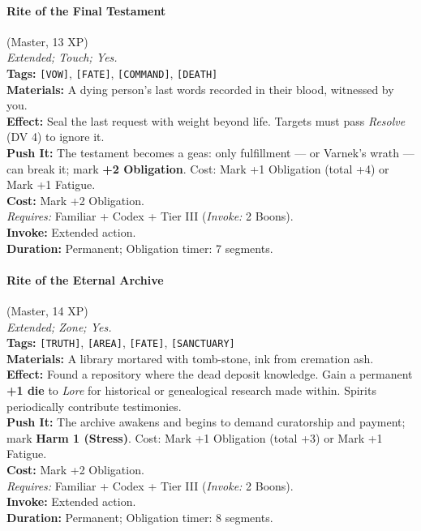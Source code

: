 \paragraph{Rite of the Final Testament} (Master, 13 XP) \hfill \\
\emph{Extended; Touch; Yes.} \\
\textbf{Tags:} \texttt{[VOW]}, \texttt{[FATE]}, \texttt{[COMMAND]}, \texttt{[DEATH]} \\
\textbf{Materials:} A dying person's last words recorded in their blood, witnessed by you. \\
\textbf{Effect:} Seal the last request with weight beyond life. Targets must pass \textit{Resolve} (DV 4) to ignore it. \\
\textbf{Push It:} The testament becomes a geas: only fulfillment --- or Varnek's wrath --- can break it; mark \textbf{+2 Obligation}. Cost: Mark +1 Obligation (total +4) or Mark +1 Fatigue. \\
\textbf{Cost:} Mark +2 Obligation. \\
\textit{Requires:} Familiar + Codex + Tier III (\textit{Invoke:} 2 Boons). \\
\textbf{Invoke:} Extended action. \\
\textbf{Duration:} Permanent; Obligation timer: 7 segments.

\paragraph{Rite of the Eternal Archive} (Master, 14 XP) \hfill \\
\emph{Extended; Zone; Yes.} \\
\textbf{Tags:} \texttt{[TRUTH]}, \texttt{[AREA]}, \texttt{[FATE]}, \texttt{[SANCTUARY]} \\
\textbf{Materials:} A library mortared with tomb-stone, ink from cremation ash. \\
\textbf{Effect:} Found a repository where the dead deposit knowledge. Gain a permanent \textbf{+1 die} to \textit{Lore} for historical or genealogical research made within. Spirits periodically contribute testimonies. \\
\textbf{Push It:} The archive awakens and begins to demand curatorship and payment; mark \textbf{Harm 1 (Stress)}. Cost: Mark +1 Obligation (total +3) or Mark +1 Fatigue. \\
\textbf{Cost:} Mark +2 Obligation. \\
\textit{Requires:} Familiar + Codex + Tier III (\textit{Invoke:} 2 Boons). \\
\textbf{Invoke:} Extended action. \\
\textbf{Duration:} Permanent; Obligation timer: 8 segments.

